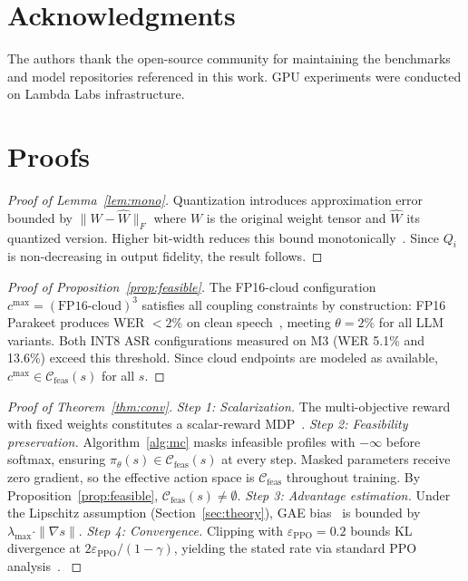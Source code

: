\documentclass{article}
\begin{document}
\section*{Acknowledgments}

The authors thank the open-source community for maintaining the benchmarks and model repositories referenced in this work. GPU experiments were conducted on Lambda Labs infrastructure.




\appendix

\section{Proofs}
\label{app:proofs}

\begin{proof}[Proof of Lemma~\ref{lem:mono}]
Quantization introduces approximation error bounded by $\|W - \hat{W}\|_F$ where $W$ is the original weight tensor and $\hat{W}$ its quantized version. Higher bit-width reduces this bound monotonically~\citep{dettmers2022llmint8,han2016deep,nagel2020datafree}. Since $Q_i$ is non-decreasing in output fidelity, the result follows.
\end{proof}

\begin{proof}[Proof of Proposition~\ref{prop:feasible}]
The FP16-cloud configuration $c^{\max}=(\text{FP16-cloud})^3$ satisfies all coupling constraints by construction: FP16 Parakeet produces WER $<2\%$ on clean speech~\citep{parakeet2025}, meeting $\theta = 2\%$ for all LLM variants. Both INT8 ASR configurations measured on M3 (WER 5.1\% and 13.6\%) exceed this threshold. Since cloud endpoints are modeled as available, $c^{\max}\in\mathcal{C}_{\text{feas}}(s)$ for all $s$.
\end{proof}

\begin{proof}[Proof of Theorem~\ref{thm:conv}]
\emph{Step 1: Scalarization.} The multi-objective reward with fixed weights constitutes a scalar-reward MDP~\citep{hayes2022morl}. \emph{Step 2: Feasibility preservation.} Algorithm~\ref{alg:mc} masks infeasible profiles with $-\infty$ before softmax, ensuring $\pi_\theta(s)\in\mathcal{C}_{\text{feas}}(s)$ at every step. Masked parameters receive zero gradient, so the effective action space is $\mathcal{C}_{\text{feas}}$ throughout training. By Proposition~\ref{prop:feasible}, $\mathcal{C}_{\text{feas}}(s)\neq\emptyset$. \emph{Step 3: Advantage estimation.} Under the Lipschitz assumption (Section~\ref{sec:theory}), GAE bias~\citep{schulman2016gae} is bounded by $\lambda_{\max}\cdot\|\nabla s\|$. \emph{Step 4: Convergence.} Clipping with $\varepsilon_{\text{PPO}}=0.2$ bounds KL divergence at $2\varepsilon_{\text{PPO}}/(1-\gamma)$, yielding the stated rate via standard PPO analysis~\citep{schulman2017ppo}. \label{eq:eps_bound}
\end{proof}
\end{document}
